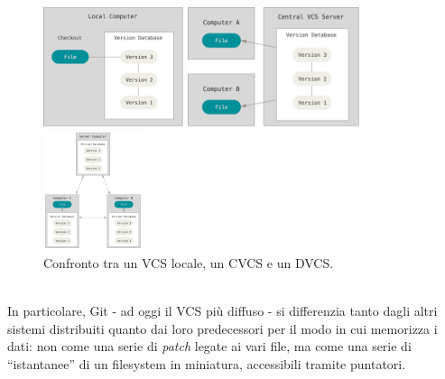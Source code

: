 \documentclass[12pt]{article}
\def\quote#1{``#1''}
\begin{document}
\begin{figure}[h]
	\centering
		\begin{minipage}{4cm}
			\includegraphics[height=3.5cm]{local.png}
		\end{minipage}
		\qquad
		\begin{minipage}{4cm}
			 \includegraphics[height=3.5cm]{centralized.png}
		\end{minipage}
		\qquad
		\qquad
		\begin{minipage}{4cm}
			\includegraphics[height=3.5cm]{distributed.png}
		\end{minipage}
	\caption{Confronto tra un VCS locale, un CVCS e un DVCS.}
\end{figure}
\\In particolare, Git - ad oggi il VCS più diffuso \cite{openhub} - si differenzia tanto dagli altri sistemi distribuiti quanto dai loro predecessori per il modo in cui memorizza i dati: non come una serie di \textit{patch} legate ai vari file, ma come una serie di \quote{istantanee} di un filesystem in miniatura, accessibili tramite puntatori.
\end{document}
